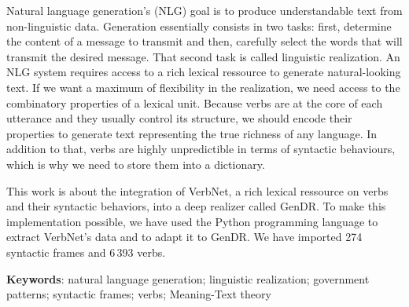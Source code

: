 Natural language generation's (NLG) goal is to produce understandable text from non-linguistic data. Generation essentially consists in two tasks: first, determine the content of a message to transmit and then, carefully select the words that will transmit the desired message. That second task is called linguistic realization. An NLG system requires access to a rich lexical ressource to generate natural-looking text. If we want a maximum of flexibility in the realization, we need access to the combinatory properties of a lexical unit. Because verbs are at the core of each utterance and they usually control its structure, we should encode their properties to generate text representing the true richness of any language. In addition to that, verbs are highly unpredictible in terms of syntactic behaviours, which is why we need to store them into a dictionary.

This work is about the integration of VerbNet, a rich lexical ressource on verbs and their syntactic behaviors, into a deep realizer called GenDR. To make this implementation possible, we have used the Python programming language to extract VerbNet's data and to adapt it to GenDR. We have imported 274 syntactic frames and 6\,393 verbs.

\textbf{Keywords}: natural language generation; linguistic realization; government patterns; syntactic frames; verbs; Meaning-Text theory